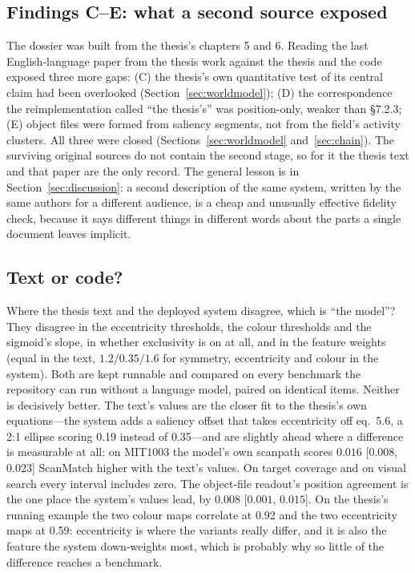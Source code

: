 \documentclass[11pt,a4paper]{article}
\begin{document}
\subsection{Findings C--E: what a second source exposed}
\label{sec:findingsCDE}
The dossier was built from the thesis's chapters 5 and 6. Reading the last
English-language paper from the thesis work \citep{backer2003} against the thesis
and the code exposed three more gaps: (C) the thesis's own quantitative test of
its central claim had been overlooked (Section~\ref{sec:worldmodel}); (D) the
correspondence the reimplementation called ``the thesis's'' was position-only,
weaker than \S7.2.3; (E) object files were formed from saliency segments, not
from the field's activity clusters. All three were closed
(Sections~\ref{sec:worldmodel} and~\ref{sec:chain}). The surviving original
sources do not contain the second stage, so for it the thesis text and that paper
are the only record. The general lesson is in
Section~\ref{sec:discussion}: a second description of the same system, written
by the same authors for a different audience, is a cheap and unusually effective
fidelity check, because it says different things in different words about the
parts a single document leaves implicit.

\subsection{Text or code?}
\label{sec:textcode}
Where the thesis text and the deployed system disagree, which is ``the model''?
They disagree in the eccentricity thresholds, the colour thresholds and the
sigmoid's slope, in whether exclusivity is on at all, and in the feature weights
(equal in the text, $1.2 / 0.35 / 1.6$ for symmetry, eccentricity and colour in
the system). Both are kept runnable and compared on every benchmark the
repository can run without a language model, paired on identical items. Neither
is decisively better. The text's values are the closer fit to the thesis's own
equations---the system adds a saliency offset that takes eccentricity off
eq.~5.6, a 2:1 ellipse scoring 0.19 instead of 0.35---and are slightly ahead
where a difference is measurable at all: on MIT1003 the model's own scanpath
scores $0.016$ [$0.008$, $0.023$] ScanMatch higher with the text's values. On
target coverage and on visual search every interval includes zero. The
object-file readout's position agreement is the one place the system's values
lead, by $0.008$ [$0.001$, $0.015$]. On the thesis's running example the two
colour maps correlate at 0.92 and the two eccentricity maps at 0.59: eccentricity
is where the variants really differ, and it is also the feature the system
down-weights most, which is probably why so little of the difference reaches a
benchmark.
\end{document}
